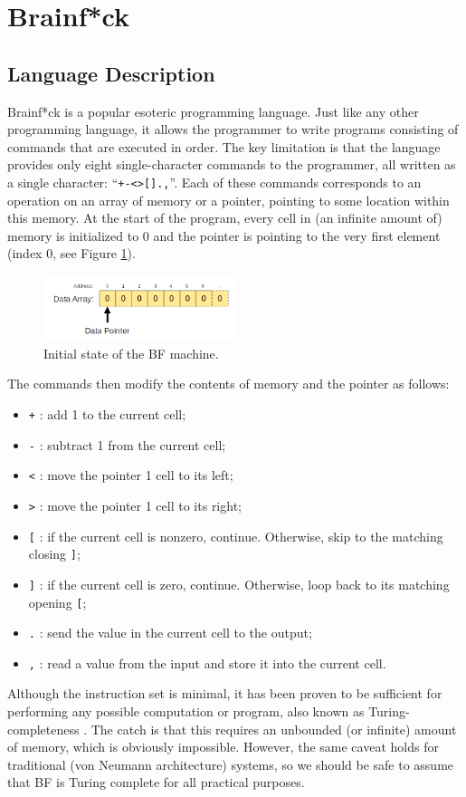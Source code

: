 \section{Brainf*ck}\label{sec:brainfck}
\subsection{Language Description}
Brainf*ck is a popular esoteric programming language. Just like any other programming language, it allows the programmer to write programs consisting of commands that are executed in order. The key limitation is that the language provides only eight single-character commands to the programmer, all written as a single character: ``\texttt{+-<>[].,}''. Each of these commands corresponds to an operation on an array of memory or a pointer, pointing to some location within this memory. At the start of the program, every cell in (an infinite amount of) memory is initialized to 0 and the pointer is pointing to the very first element (index 0, see Figure \ref{fig:bfmachine_initial}).
%
\begin{figure}[H]
  \centering
  \includegraphics[width=0.5\textwidth]{img/bfmachine_initial}
  \caption{Initial state of the BF machine.}
  \label{fig:bfmachine_initial}
\end{figure}
%
The commands then modify the contents of memory and the pointer as follows:
\begin{itemize}
\item \texttt{+} : add 1 to the current cell;
\item \texttt{-} : subtract 1 from the current cell;
\item \texttt{<} : move the pointer 1 cell to its left;
\item \texttt{>} : move the pointer 1 cell to its right;
\item \texttt{[} : if the current cell is nonzero, continue. Otherwise, skip to the matching closing \texttt{]};
\item \texttt{]} : if the current cell is zero, continue. Otherwise, loop back to its matching opening \texttt{[};
\item \texttt{.} : send the value in the current cell to the output;
\item \texttt{,} : read a value from the input and store it into the current cell.
\end{itemize}
Although the instruction set is minimal, it has been proven to be sufficient for performing any possible computation or program, also known as Turing-completeness \cite{esolangs-bf}. The catch is that this requires an unbounded (or infinite) amount of memory, which is obviously impossible. However, the same caveat holds for traditional (von Neumann architecture) systems, so we should be safe to assume that BF is Turing complete for all practical purposes.

